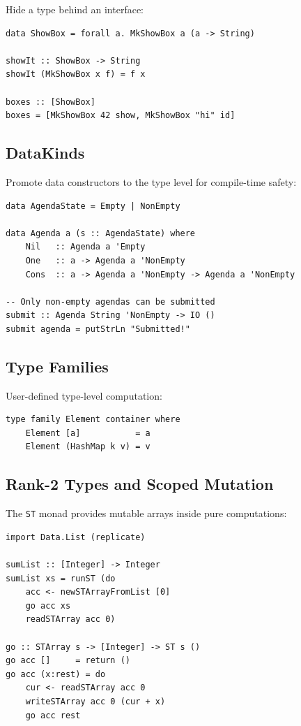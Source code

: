 \documentclass[11pt,a4paper]{article}
\begin{document}
Hide a type behind an interface:

\begin{lstlisting}
data ShowBox = forall a. MkShowBox a (a -> String)

showIt :: ShowBox -> String
showIt (MkShowBox x f) = f x

boxes :: [ShowBox]
boxes = [MkShowBox 42 show, MkShowBox "hi" id]
\end{lstlisting}

\subsection{DataKinds}

Promote data constructors to the type level for compile-time safety:

\begin{lstlisting}
data AgendaState = Empty | NonEmpty

data Agenda a (s :: AgendaState) where
    Nil   :: Agenda a 'Empty
    One   :: a -> Agenda a 'NonEmpty
    Cons  :: a -> Agenda a 'NonEmpty -> Agenda a 'NonEmpty

-- Only non-empty agendas can be submitted
submit :: Agenda String 'NonEmpty -> IO ()
submit agenda = putStrLn "Submitted!"
\end{lstlisting}

\subsection{Type Families}

User-defined type-level computation:

\begin{lstlisting}
type family Element container where
    Element [a]           = a
    Element (HashMap k v) = v
\end{lstlisting}

\subsection{Rank-2 Types and Scoped Mutation}

The \texttt{ST} monad provides mutable arrays inside pure computations:

\begin{lstlisting}
import Data.List (replicate)

sumList :: [Integer] -> Integer
sumList xs = runST (do
    acc <- newSTArrayFromList [0]
    go acc xs
    readSTArray acc 0)

go :: STArray s -> [Integer] -> ST s ()
go acc []     = return ()
go acc (x:rest) = do
    cur <- readSTArray acc 0
    writeSTArray acc 0 (cur + x)
    go acc rest
\end{lstlisting}
\end{document}
